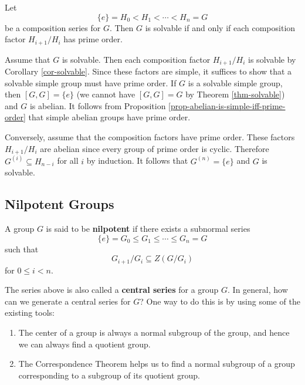 \begin{theorem}
	Let
	$$\{e\} = H_0 < H_1 < \cdots < H_n = G$$
	be a composition series for $G$. Then $G$ is solvable if and only if each composition factor $H_{i+1}/H_i$ has prime order.
\end{theorem}

\begin{sketch}
	Assume that $G$ is solvable. Then each composition factor $H_{i+1}/H_i$ is solvable by Corollary \ref{cor-solvable}. Since these factors are simple, it suffices to show that a solvable simple group must have prime order. If $G$ is a solvable simple group, then $[G,G] =\{e\}$ (we cannot have $[G,G] = G$ by Theorem \ref{thm-solvable}) and $G$ is abelian. It follows from Proposition \ref{prop-abelian-is-simple-iff-prime-order} that simple abelian groups have prime order. 
	
	
Conversely, assume that the composition factors have prime order. These factors $H_{i+1}/H_i$ are abelian since every group of prime order is cyclic.  Therefore $G^{(i)} \subseteq H_{n-i}$ for all $i$ by induction.  It follows that $G^{(n)} = \{e\}$ and $G$ is solvable.
\end{sketch} 




\subsection{Nilpotent Groups}
\begin{definition}
	A group $G$ is said to be \textbf{nilpotent} if there exists a subnormal series
	\begin{equation*}
		\{e\} = G_0 \leq G_1 \leq \cdots \leq G_n = G
	\end{equation*}
	such that
	\begin{equation*}
		G_{i+1}/G_{i} \subseteq Z(G/G_{i})
	\end{equation*}
	for $0\leq i<n$.
\end{definition}

The series above is also called a \textbf{central series} for a group $G$.
In general, how can we generate a central series for $ G $? One way to do this is by using some of the existing tools: 
\begin{enumerate}[(1)]
	\item The center of a group is always a normal subgroup of the group, and hence we can always find a quotient group.
	\item The Correspondence Theorem helps us to find a normal subgroup of a group corresponding to a subgroup of its quotient group.
\end{enumerate}

